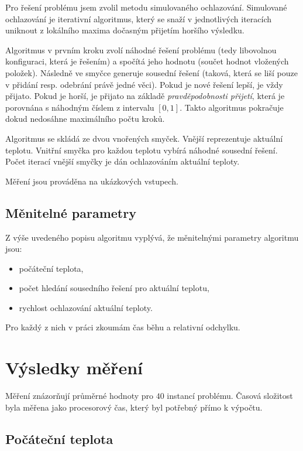 \documentclass[czech]{article}
\begin{document}
Pro řešení problému jsem zvolil metodu simulovaného ochlazování.
Simulované ochlazování je iterativní algoritmus, který se snaží v jednotlivých iteracích uniknout z lokálního maxima dočasným přijetím horšího výsledku.

Algoritmus v prvním kroku zvolí náhodné řešení problému (tedy libovolnou konfiguraci, která je řešením) a spočítá jeho hodnotu (součet hodnot vložených položek).
Následně ve smyčce generuje sousední řešení (taková, která se liší pouze v přidání resp. odebrání právě jedné věci).
Pokud je nové řešení lepší, je vždy přijato.
Pokud je horší, je přijato na základě \textit{pravděpodobnosti přijetí}, která je porovnána s náhodným číslem z intervalu $[0, 1]$.
Takto algoritmus pokračuje dokud nedosáhne maximálního počtu kroků.

Algoritmus se skládá ze dvou vnořených smyček.
Vnější reprezentuje aktuální teplotu.
Vnitřní smyčka pro každou teplotu vybírá náhodné sousední řešení.
Počet iterací vnější smyčky je dán ochlazováním aktuální teploty.

Měření jsou prováděna na ukázkových vstupech.

\subsection*{Měnitelné parametry}

Z výše uvedeného popisu algoritmu vyplývá, že měnitelnými parametry algoritmu jsou:

\begin{itemize}
    \item počáteční teplota,
    \item počet hledání sousedního řešení pro aktuální teplotu,
    \item rychlost ochlazování aktuální teploty.
\end{itemize}

Pro každý z nich v práci zkoumám čas běhu a relativní odchylku.

\section{Výsledky měření}

Měření znázorňují průměrné hodnoty pro $40$ instancí problému.
Časová složitost byla měřena jako procesorový čas, který byl potřebný přímo k výpočtu.

\subsection{Počáteční teplota}
\end{document}
